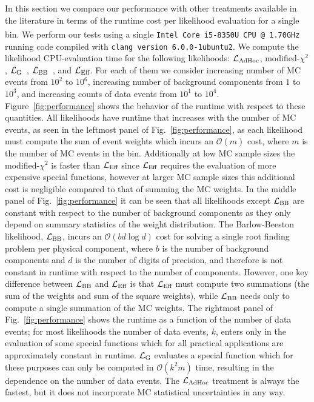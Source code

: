 \documentclass[a4paper, 11pt]{article}
\newcommand{\like}{\mathcal{L}}
\newcommand{\mcl}{\like_\textmd{Eff}}
\newcommand{\gl}{\like_\textmd{G}}
\newcommand{\adhoc}{\mathcal{L}_{\textmd{AdHoc}}}
\newcommand{\lbarlow}{\like_{\textmd{BB}}}
\begin{document}
In this section we compare our performance with other treatments available in the literature in terms of the runtime cost per likelihood evaluation for a single bin. We perform our tests using a single \texttt{Intel\textsuperscript{\textregistered} Core\texttrademark{} i5-8350U CPU @ 1.70GHz} running code compiled with \texttt{clang version 6.0.0-1ubuntu2}. We compute the likelihood CPU-evaluation time for the following likelihoods: $\adhoc$, modified-$\chi^2$, $\gl$~\cite{Glusenkamp:2017rlp}, $\lbarlow$~\cite{Barlow:1993dm}, and $\mcl$. For each of them we consider increasing number of MC events from $10^2$ to $10^6$, increasing number of background components from $1$ to $10^3$, and increasing counts of data events from $10^1$ to $10^4$. Figure~\ref{fig:performance} shows the behavior of the runtime with respect to these quantities. All likelihoods have runtime that increases with the number of MC events, as seen in the leftmost panel of Fig.~\ref{fig:performance}, as each likelihood must compute the sum of event weights which incurs an $\mathcal{O}(m)$ cost, where $m$ is the number of MC events in the bin. Additionally at low MC sample sizes the modified-$\chi^2$ is faster than $\mcl$ since $\mcl$ requires the evaluation of more expensive special functions, however at larger MC sample sizes this additional cost is negligible compared to that of summing the MC weights. In the middle panel of Fig.~\ref{fig:performance} it can be seen that all likelihoods except $\lbarlow$ are constant with respect to the number of background components as they only depend on summary statistics of the weight distribution. The Barlow-Beeston likelihood, $\lbarlow$, incurs an $\mathcal{O}(b d \log d)$ cost for solving a single root finding problem per physical component, where $b$ is the number of background components and $d$ is the number of digits of precision, and therefore is not constant in runtime with respect to the number of components. However, one key difference between $\lbarlow$ and $\mcl$ is that $\mcl$ must compute two summations (the sum of the weights and sum of the square weights), while $\lbarlow$ needs only to compute a single summation of the MC weights. The rightmost panel of Fig.~\ref{fig:performance} shows the runtime as a function of the number of data events; for most likelihoods the number of data events, $k$, enters only in the evaluation of some special functions which for all practical applications are approximately constant in runtime. $\gl$ evaluates a special function which for these purposes can only be computed in $\mathcal{O}(k^2 m)$ time, resulting in the dependence on the number of data events.
The $\adhoc$ treatment is always the fastest, but it does not incorporate MC statistical uncertainties in any way.
\end{document}
